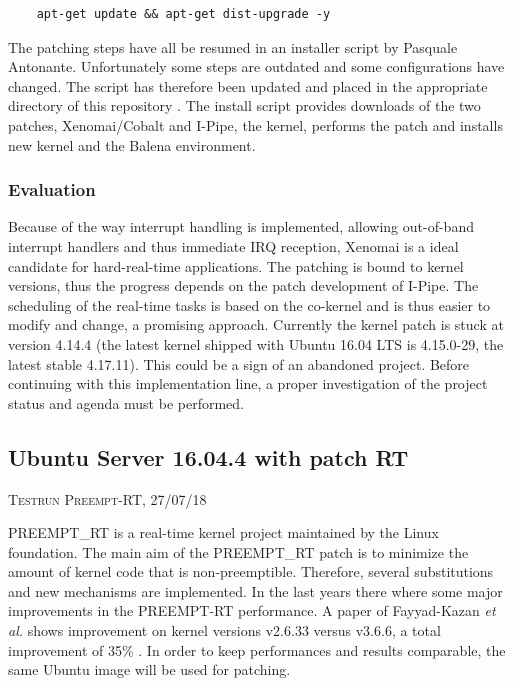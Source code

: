 \documentclass[]{scrartcl}
\begin{document}
\begin{verbatim}
	apt-get update && apt-get dist-upgrade -y
\end{verbatim}

The patching steps have all be resumed in an installer script by Pasquale Antonante. Unfortunately some steps are outdated and some configurations have changed. The script has therefore been updated and placed in the appropriate directory of this repository \cite{gitrepo}. The install script provides downloads of the two patches, Xenomai/Cobalt and I-Pipe, the kernel, performs the patch and installs new kernel and the Balena environment.

\subsubsection{Evaluation}

Because of the way interrupt handling is implemented, allowing out-of-band interrupt handlers and thus immediate IRQ reception, Xenomai is a ideal candidate for hard-real-time applications. The patching is bound to kernel versions, thus the progress depends on the patch development of I-Pipe. 
The scheduling of the real-time tasks is based on the co-kernel and is thus easier to modify and change, a promising approach.
Currently the kernel patch is stuck at version 4.14.4 (the latest kernel shipped with Ubuntu 16.04 LTS is 4.15.0-29, the latest stable 4.17.11). This could be a sign of an abandoned project. Before continuing with this implementation line, a proper investigation of the project status and agenda must be performed.

\subsection{Ubuntu Server 16.04.4 with patch RT}

{\small\textsc{Testrun Preempt-RT, 27/07/18} \bigskip}

PREEMPT\_RT is a real-time kernel project maintained by the Linux foundation. 
The main aim of the PREEMPT\_RT patch is to minimize the amount of kernel code that is non-preemptible. Therefore, several substitutions and new mechanisms are implemented.
In the last years there where some major improvements in the PREEMPT-RT performance. A paper of Fayyad-Kazan \textit{et al.} shows improvement on kernel versions v2.6.33 versus v3.6.6, a total improvement of 35\% \cite{Fayyad-Kazanetal2014}. In order to keep performances and results comparable, the same Ubuntu image will be used for patching.
\end{document}
